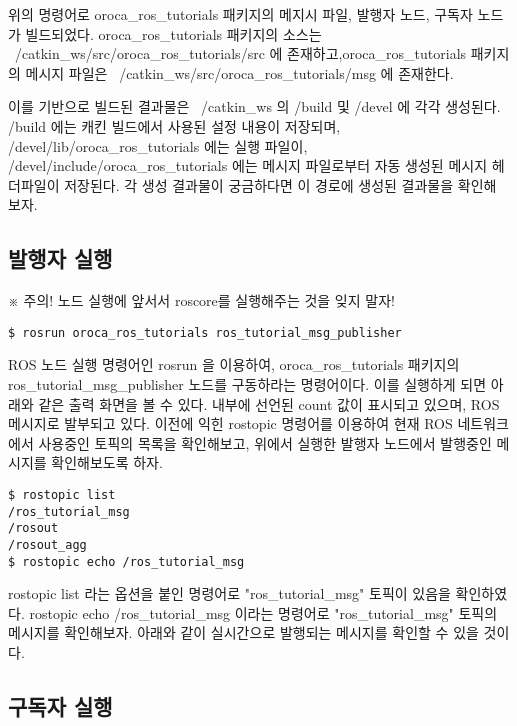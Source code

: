 위의 명령어로 oroca\_ros\_tutorials 패키지의 메지시 파일, 발행자 노드, 구독자 노드가 빌드되었다. 
oroca\_ros\_tutorials 패키지의 소스는 ~/catkin\_ws/src/oroca\_ros\_tutorials/src 에 존재하고,oroca\_ros\_tutorials 패키지의 메시지 파일은 ~/catkin\_ws/src/oroca\_ros\_tutorials/msg 에 존재한다.

이를 기반으로 빌드된 결과물은 ~/catkin\_ws 의 /build 및 /devel 에 각각 생성된다.
/build 에는 캐킨 빌드에서 사용된 설정 내용이 저장되며, /devel/lib/oroca\_ros\_tutorials 에는 실행 파일이, /devel/include/oroca\_ros\_tutorials 에는 메시지 파일로부터 자동 생성된 메시지 헤더파일이 저장된다. 각 생성 결과물이 궁금하다면 이 경로에 생성된 결과물을 확인해 보자.

\subsection{발행자 실행}

※ 주의! 노드 실행에 앞서서 roscore를 실행해주는 것을 잊지 말자!

\begin{lstlisting}[language=ROS]
$ rosrun oroca_ros_tutorials ros_tutorial_msg_publisher
\end{lstlisting}

ROS 노드 실행 명령어인 rosrun 을 이용하여, oroca\_ros\_tutorials 패키지의 ros\_tutorial\_msg\_publisher 노드를 구동하라는 명령어이다. 이를 실행하게 되면 아래와 같은 출력 화면을 볼 수 있다. 내부에 선언된 count 값이 표시되고 있으며, ROS 메시지로 발부되고 있다. 이전에 익힌 rostopic 명령어를 이용하여 현재 ROS 네트워크에서 사용중인 토픽의 목록을 확인해보고, 위에서 실행한 발행자 노드에서 발행중인 메시지를 확인해보도록 하자.

\begin{lstlisting}[language=ROS]
$ rostopic list
/ros_tutorial_msg
/rosout
/rosout_agg
$ rostopic echo /ros_tutorial_msg
\end{lstlisting}

rostopic list 라는 옵션을 붙인 명령어로 "ros\_tutorial\_msg" 토픽이 있음을 확인하였다. rostopic echo /ros\_tutorial\_msg 이라는 명령어로 "ros\_tutorial\_msg" 토픽의 메시지를 확인해보자. 아래와 같이 실시간으로 발행되는 메시지를 확인할 수 있을 것이다.

\subsection{구독자 실행}

